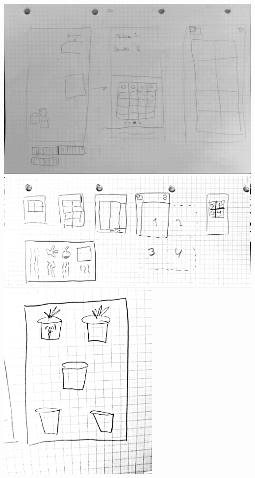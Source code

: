 \includegraphics[width=1\textwidth]{img/s1-1.jpg}\\
\includegraphics[width=1\textwidth]{img/s1-3.jpg}\\
\includegraphics[width=0.6\textwidth]{img/s1-5.jpg}\\
